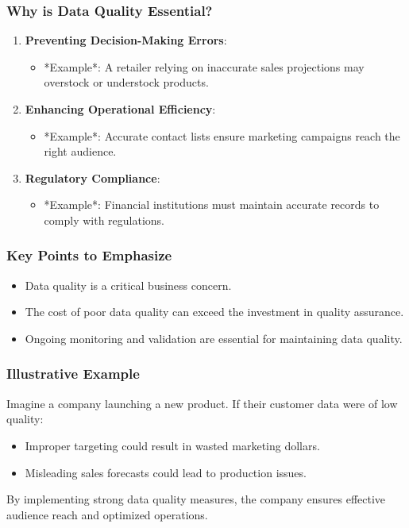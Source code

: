 \documentclass[aspectratio=169]{beamer}
\begin{document}
\begin{frame}[fragile]
    \frametitle{Why is Data Quality Essential?}
    \begin{enumerate}
        \item \textbf{Preventing Decision-Making Errors}:
            \begin{itemize}
                \item *Example*: A retailer relying on inaccurate sales projections may overstock or understock products.
            \end{itemize}
        \item \textbf{Enhancing Operational Efficiency}:
            \begin{itemize}
                \item *Example*: Accurate contact lists ensure marketing campaigns reach the right audience.
            \end{itemize}
        \item \textbf{Regulatory Compliance}:
            \begin{itemize}
                \item *Example*: Financial institutions must maintain accurate records to comply with regulations.
            \end{itemize}
    \end{enumerate}
\end{frame}

\begin{frame}[fragile]
    \frametitle{Key Points to Emphasize}
    \begin{itemize}
        \item Data quality is a critical business concern.
        \item The cost of poor data quality can exceed the investment in quality assurance.
        \item Ongoing monitoring and validation are essential for maintaining data quality.
    \end{itemize}
\end{frame}

\begin{frame}[fragile]
    \frametitle{Illustrative Example}
    Imagine a company launching a new product. If their customer data were of low quality:
    \begin{itemize}
        \item Improper targeting could result in wasted marketing dollars.
        \item Misleading sales forecasts could lead to production issues.
    \end{itemize}
    By implementing strong data quality measures, the company ensures effective audience reach and optimized operations.
\end{frame}
\end{document}
